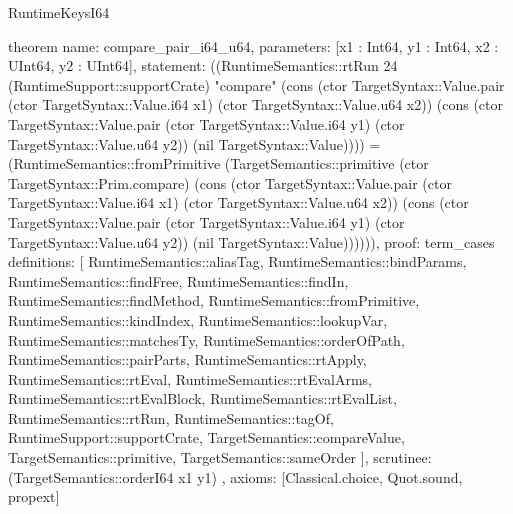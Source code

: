 \begin{lexlean}{RuntimeKeysI64}
\begin{semanticmodule}
theorem{
  name: compare_pair_i64_u64,
  parameters: [x1 : Int64, y1 : Int64, x2 : UInt64, y2 : UInt64],
  statement: ((RuntimeSemantics::rtRun 24 (RuntimeSupport::supportCrate) "compare" (cons (ctor TargetSyntax::Value.pair (ctor TargetSyntax::Value.i64 x1) (ctor TargetSyntax::Value.u64 x2)) (cons (ctor TargetSyntax::Value.pair (ctor TargetSyntax::Value.i64 y1) (ctor TargetSyntax::Value.u64 y2)) (nil TargetSyntax::Value)))) = (RuntimeSemantics::fromPrimitive (TargetSemantics::primitive (ctor TargetSyntax::Prim.compare) (cons (ctor TargetSyntax::Value.pair (ctor TargetSyntax::Value.i64 x1) (ctor TargetSyntax::Value.u64 x2)) (cons (ctor TargetSyntax::Value.pair (ctor TargetSyntax::Value.i64 y1) (ctor TargetSyntax::Value.u64 y2)) (nil TargetSyntax::Value)))))),
  proof: term_cases{
    definitions: [
      RuntimeSemantics::aliasTag,
      RuntimeSemantics::bindParams,
      RuntimeSemantics::findFree,
      RuntimeSemantics::findIn,
      RuntimeSemantics::findMethod,
      RuntimeSemantics::fromPrimitive,
      RuntimeSemantics::kindIndex,
      RuntimeSemantics::lookupVar,
      RuntimeSemantics::matchesTy,
      RuntimeSemantics::orderOfPath,
      RuntimeSemantics::pairParts,
      RuntimeSemantics::rtApply,
      RuntimeSemantics::rtEval,
      RuntimeSemantics::rtEvalArms,
      RuntimeSemantics::rtEvalBlock,
      RuntimeSemantics::rtEvalList,
      RuntimeSemantics::rtRun,
      RuntimeSemantics::tagOf,
      RuntimeSupport::supportCrate,
      TargetSemantics::compareValue,
      TargetSemantics::primitive,
      TargetSemantics::sameOrder
    ],
    scrutinee: (TargetSemantics::orderI64 x1 y1)
  },
  axioms: [Classical.choice, Quot.sound, propext]
}


\end{semanticmodule}
\end{lexlean}
